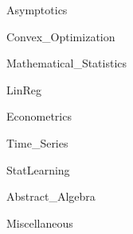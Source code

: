 \documentclass{book}
\numberwithin{equation}{chapter}
\theoremstyle{definition}
\numberwithin{theorem}{section}
\theoremstyle{definition}
\theoremstyle{definition}
\theoremstyle{definition}
\theoremstyle{definition}
\theoremstyle{definition}
\theoremstyle{definition}
\begin{document}
{Asymptotics}

\pagebreak

{Convex_Optimization}

\pagebreak

{Mathematical_Statistics}

\pagebreak

{LinReg}

\pagebreak

{Econometrics}

\pagebreak

{Time_Series}

\pagebreak


{StatLearning}

\pagebreak

{Abstract_Algebra}

\pagebreak

{Miscellaneous}



\end{document}
